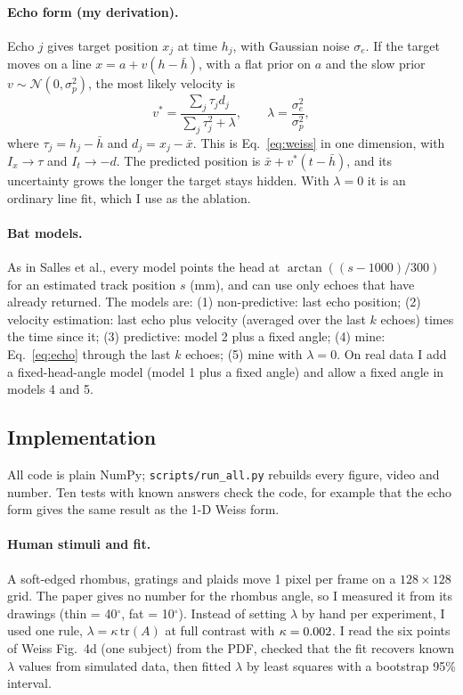 \documentclass[11pt]{article}
\begin{document}
\paragraph{Echo form (my derivation).} Echo $j$ gives target position $x_j$ at time $h_j$, with Gaussian noise $\sigma_e$. If the target moves on a line $x=a+v(h-\bar h)$, with a flat prior on $a$ and the slow prior $v\sim\mathcal{N}(0,\sigma_p^2)$, the most likely velocity is
\begin{equation}
v^*=\frac{\sum_j \tau_j d_j}{\sum_j \tau_j^2+\lambda},\qquad \lambda=\frac{\sigma_e^2}{\sigma_p^2},
\label{eq:echo}
\end{equation}
where $\tau_j=h_j-\bar h$ and $d_j=x_j-\bar x$. This is Eq.~\ref{eq:weiss} in one dimension, with $I_x\to\tau$ and $I_t\to-d$. The predicted position is $\bar x+v^*(t-\bar h)$, and its uncertainty grows the longer the target stays hidden. With $\lambda=0$ it is an ordinary line fit, which I use as the ablation.

\paragraph{Bat models.} As in Salles et al., every model points the head at $\arctan((s-1000)/300)$ for an estimated track position $s$ (mm), and can use only echoes that have already returned. The models are: (1) non-predictive: last echo position; (2) velocity estimation: last echo plus velocity (averaged over the last $k$ echoes) times the time since it; (3) predictive: model 2 plus a fixed angle; (4) mine: Eq.~\ref{eq:echo} through the last $k$ echoes; (5) mine with $\lambda=0$. On real data I add a fixed-head-angle model (model 1 plus a fixed angle) and allow a fixed angle in models 4 and 5.

\subsection{Implementation}
All code is plain NumPy; \texttt{scripts/run\_all.py} rebuilds every figure, video and number. Ten tests with known answers check the code, for example that the echo form gives the same result as the 1-D Weiss form.

\paragraph{Human stimuli and fit.} A soft-edged rhombus, gratings and plaids move 1 pixel per frame on a $128\times128$ grid. The paper gives no number for the rhombus angle, so I measured it from its drawings (thin = 40$^\circ$, fat = 10$^\circ$). Instead of setting $\lambda$ by hand per experiment, I used one rule, $\lambda=\kappa\,\mathrm{tr}(A)$ at full contrast with $\kappa=0.002$. I read the six points of Weiss Fig.~4d (one subject) from the PDF, checked that the fit recovers known $\lambda$ values from simulated data, then fitted $\lambda$ by least squares with a bootstrap 95\% interval.
\end{document}
